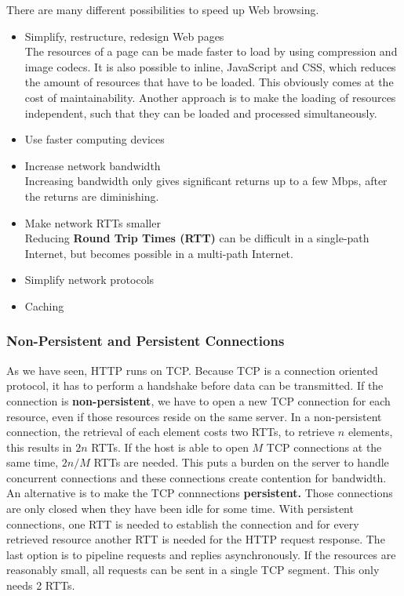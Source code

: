 There are many different possibilities to speed up Web browsing.
\begin{itemize}
\item Simplify, restructure, redesign Web pages\\
The resources of a page can be made faster to load by using compression and image codecs. It is also possible to inline, JavaScript and CSS, which reduces the amount of resources that have to be loaded. This obviously comes at the cost of maintainability. Another approach is to make the loading of resources independent, such that they can be loaded and processed simultaneously.
\item Use faster computing devices
\item Increase network bandwidth\\
Increasing bandwidth only gives significant returns up to a few Mbps, after the returns are diminishing.
\item Make network RTTs smaller\\
Reducing \textbf{Round Trip Times (RTT)} can be difficult in a single-path Internet, but becomes possible in a multi-path Internet.
\item Simplify network protocols
\item Caching
\end{itemize}

\subsubsection{Non-Persistent and Persistent Connections}
As we have seen, HTTP runs on TCP. Because TCP is a connection oriented protocol, it has to perform a handshake before data can be transmitted. If the connection is \textbf{non-persistent}, we have to open a new TCP connection for each resource, even if those resources reside on the same server. In a non-persistent connection, the retrieval of each element costs two RTTs, to retrieve $n$ elements, this results in $2n$ RTTs. If the host is able to open $M$ TCP connections at the same time, $2n/M$ RTTs are needed. This puts a burden on the server to handle concurrent connections and these connections create contention for bandwidth.\\
An alternative is to make the TCP connnections \textbf{persistent.} Those connections are only closed when they have been idle for some time. With persistent connections, one RTT is needed to establish the connection and for every retrieved resource another RTT is needed for the HTTP request response. The last option is to pipeline requests and replies asynchronously. If the resources are reasonably small, all requests can be sent in a single TCP segment. This only needs 2 RTTs.

